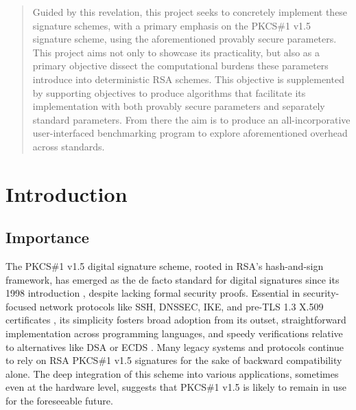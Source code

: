 \documentclass[]{final_report}
\theoremstyle{definition}
\begin{document}
\begin{abstract}
Guided by this revelation, this project seeks to concretely implement these signature schemes, with a primary emphasis on the PKCS\#1 v1.5 signature scheme, using the aforementioned provably secure parameters. This project aims not only to showcase its practicality, but also as a primary objective dissect the computational burdens these parameters introduce into deterministic RSA schemes. This objective is supplemented by supporting objectives to produce algorithms that facilitate its implementation with both provably secure parameters and separately standard parameters. From there the aim is to produce an all-incorporative user-interfaced benchmarking program to explore aforementioned overhead across standards. 
\newpage
\end{abstract}
\newpage


\chapter{Introduction}


\section{Importance}

The PKCS\#1 v1.5 digital signature scheme, rooted in RSA's hash-and-sign framework, has emerged as the de facto standard for digital signatures since its 1998 introduction \cite{rfc2313}, despite lacking formal security proofs. Essential in security-focused network protocols like SSH, DNSSEC, IKE, and pre-TLS 1.3 X.509 certificates \cite{schaad2005additional}, its simplicity fosters broad adoption from its outset, straightforward implementation across programming languages, and speedy verifications relative to alternatives like DSA or ECDS  \cite{jager2018security}. Many legacy systems and protocols continue to rely on RSA PKCS\#1 v1.5 signatures for the sake of backward compatibility alone. The deep integration of this scheme into various applications, sometimes even at the hardware level, suggests that PKCS\#1 v1.5 is likely to remain in use for the foreseeable future.
\end{document}
